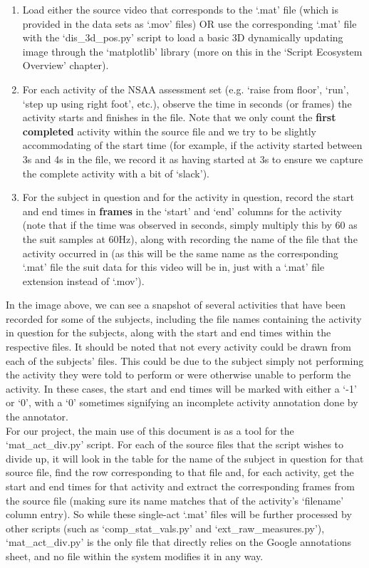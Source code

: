 \documentclass[12pt,twoside]{report}
\begin{document}
\begin{enumerate}
	\item Load either the source video that corresponds to the ‘.mat’ file (which is provided in the data sets as ‘.mov’ files) OR use the corresponding ‘.mat’ file with the ‘dis\_3d\_pos.py’ script to load a basic 3D dynamically updating image through the ‘matplotlib’ library (more on this in the ‘Script Ecosystem Overview’ chapter).
	\item For each activity of the NSAA assessment set (e.g. ‘raise from floor’, ‘run’, ‘step up using right foot’, etc.), observe the time in seconds (or frames) the activity starts and finishes in the file. Note that we only count the \textbf{first completed} activity within the source file and we try to be slightly accommodating of the start time (for example, if the activity started between 3s and 4s in the file, we record it as having started at 3s to ensure we capture the complete activity with a bit of ‘slack’).
	\item For the subject in question and for the activity in question, record the start and end times in \textbf{frames} in the ‘start’ and ‘end’ columns for the activity (note that if the time was observed in seconds, simply multiply this by 60 as the suit samples at 60Hz), along with recording the name of the file that the activity occurred in (as this will be the same name as the corresponding ‘.mat’ file the suit data for this video will be in, just with a ‘.mat’ file extension instead of ‘.mov’).
\end{enumerate}

\quad In the image above, we can see a snapshot of several activities that have been recorded for some of the subjects, including the file names containing the activity in question for the subjects, along with the start and end times within the respective files. It should be noted that not every activity could be drawn from each of the subjects’ files. This could be due to the subject simply not performing the activity they were told to perform or were otherwise unable to perform the activity. In these cases, the start and end times will be marked with either a ‘-1’ or ‘0’, with a ‘0’ sometimes signifying an incomplete activity annotation done by the annotator.\\

\quad For our project, the main use of this document is as a tool for the ‘mat\_act\_div.py’ script. For each of the source files that the script wishes to divide up, it will look in the table for the name of the subject in question for that source file, find the row corresponding to that file and, for each activity, get the start and end times for that activity and extract the corresponding frames from the source file (making sure its name matches that of the activity’s ‘filename’ column entry). So while these single-act ‘.mat’ files will be further processed by other scripts (such as ‘comp\_stat\_vals.py’ and ‘ext\_raw\_measures.py’), ‘mat\_act\_div.py’ is the only file that directly relies on the Google annotations sheet, and no file within the system modifies it in any way.
\end{document}
